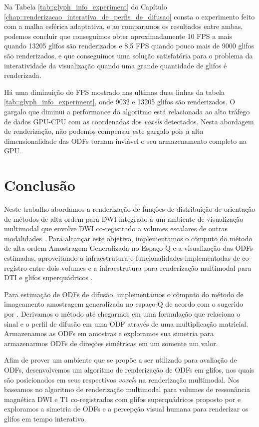 \documentclass[
    12pt,                %
    oneside,            %
    a4paper,            %
    english,            %
    french,                %
    spanish,            %
    brazil                %
    ]{abntex2}
\begin{document}
Na Tabela \ref{tab::glyph_info_experiment} do Capítulo \ref{chap::renderizacao_interativa_de_perfis_de_difusao} consta o experimento feito com a malha esférica adaptativa, e ao comparamos os resultados entre ambas, podemos concluir que conseguimos obter aproximadamente 10 FPS a mais quando 13205 glifos são renderizados e 8,5 FPS quando pouco mais de 9000 glifos são renderizados, e que conseguimos uma solução satisfatória para o problema da interatividade da visualização quando uma grande quantidade de glifos é renderizada.

Há uma diminuição do FPS mostrado nas ultimas duas linhas da tabela \ref{tab::glyph_info_experiment}, onde 9032 e 13205 glifos são renderizados. O gargalo que diminui a performance do algoritmo está relacionada ao alto tráfego de dados GPU-CPU com as coordenadas dos \textit{voxels} detectados. Nesta abordagem de renderização, não podemos compensar este gargalo pois a alta dimensionalidade das ODFs tornam inviável o seu armazenamento completo na GPU.




\chapter{Conclusão}
\label{chap::conclusao}


Neste trabalho abordamos a renderização de funções de distribuição de orientação de métodos de alta ordem para DWI integrado a um ambiente de visualização multimodal que envolve DWI co-registrado a volumes escalares de outras modalidades \cite{VMTKNeuro}. Para alcançar este objetivo, implementamos o cômputo do método de alta ordem Amostragem Generalizada no Espaço-Q e a visualização das ODFs estimadas, aproveitando a infraestrutura e funcionalidades implementadas de co-registro entre dois volumes \cite{ting2014} e a infraestrutura para renderização multimodal para DTI e glifos superquádricos \cite{voltoline2021}.

Para estimação de ODFs de difusão, implementamos o cômputo do método de imageamento amostragem generalizada no espaço-Q de acordo com o sugerido por . Derivamos o método até chegarmos em uma formulação que relaciona o sinal e o perfil de difusão em uma ODF através de uma multiplicação matricial. Armazenamos as ODFs em amostras e exploramos sua simetria para armazenarmos ODFs de direções simétricas em um somente um valor.

Afim de prover um ambiente que se propõe a ser utilizado para avaliação de ODFs, desenvolvemos um algoritmo de renderização de ODFs em glifos, nos quais são posicionados em seus respectivos \textit{voxels} na renderização multimodal. Nos baseamos no algoritmo de renderização multimodal para volumes de ressonância magnética DWI e T1 co-registrados com glifos superquádricos proposto por  e exploramos a simetria de ODFs e a percepção visual humana para renderizar os glifos em tempo interativo.
\end{document}
